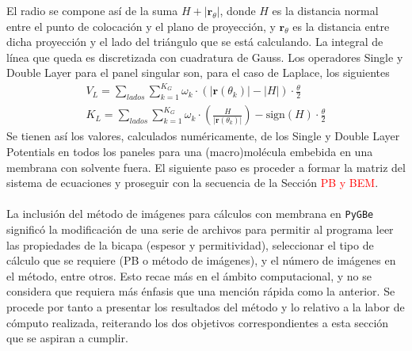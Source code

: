 \documentclass[12pt, oneside, numbers, spanish]{ezthesis}
\numberwithin{equation}{section}
\begin{document}
%

El radio se compone así de la suma $H + |\mathbf{r}_\theta|$, donde $H$ es la distancia normal entre el punto de colocación y el plano de proyección, y $\mathbf{r}_\theta$ es la distancia entre dicha proyección y el lado del triángulo que se está calculando. La integral de línea que queda es discretizada con cuadratura de Gauss. Los operadores Single y Double Layer para el panel singular son, para el caso de Laplace, los siguientes
\begin{gather}
V_L = \sum_{lados}\sum_{k=1}^{K_G}\omega_k\cdot (|\mathbf{r}(\theta_k)| - |H|)\cdot\frac{\theta}{2}\\
K_L = \sum_{lados}\sum_{k=1}^{K_G}\omega_k\cdot \left(\frac{H}{|\mathbf{r}(\theta_k)|}\right) - \text{sign}(H) \cdot\frac{\theta}{2}
\end{gather}
Se tienen así los valores, calculados numéricamente, de los Single y Double Layer Potentials en todos los paneles para una (macro)molécula embebida en una membrana con solvente fuera. El siguiente paso es proceder a formar la matriz del sistema de ecuaciones y proseguir con la secuencia de la Sección \textcolor{red}{PB y BEM}.\\\\
La inclusión del método de imágenes para cálculos con membrana en \texttt{PyGBe} significó la modificación de una serie de archivos para permitir al programa leer las propiedades de la bicapa (espesor y permitividad), seleccionar el tipo de cálculo que se requiere (PB o método de imágenes), y el número de imágenes en el método, entre otros. Esto recae más en el ámbito computacional, y no se considera que requiera más énfasis que una mención rápida como la anterior. Se procede por tanto a presentar los resultados del método y lo relativo a la labor de cómputo realizada, reiterando los dos objetivos correspondientes a esta sección que se aspiran a cumplir.
\end{document}
